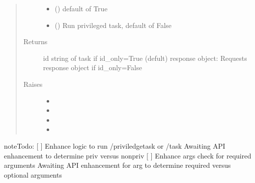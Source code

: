 \documentclass[letterpaper,10pt,english]{sphinxmanual}
\begin{document}
\begin{fulllineitems}
\begin{fulllineitems}
\begin{quote}
\begin{description}
\begin{itemize}
\item {} 
\sphinxAtStartPar
{} () \textendash{} default of True

\item {} 
\sphinxAtStartPar
{} () \textendash{} Run privileged task, default of False

\end{itemize}

\item[{Returns}] \leavevmode
\sphinxAtStartPar
id string of task if id\_only=True (defult)
response object: Requests response object if id\_only=False

\item[{Raises}] \leavevmode\begin{itemize}
\item {} 
\sphinxAtStartPar
{} \textendash{} 

\item {} 
\sphinxAtStartPar
{}\sphinxstyleliteralstrong{\sphinxupquote{ (}}\sphinxstyleliteralstrong{\sphinxupquote{)}} \textendash{} 

\item {} 
\sphinxAtStartPar
{} \textendash{} 

\item {} 
\sphinxAtStartPar
{} \textendash{} 

\end{itemize}

\end{description}\end{quote}

\begin{sphinxadmonition}{note}{\label{\detokenize{b1diagnostics-class:id1}}Todo:}
\sphinxAtStartPar
{[} {]} Enhance logic to run /priviledgetask or /task
Awaiting API enhancement to determine priv versus non\sphinxhyphen{}priv
{[} {]} Enhance args check for required arguments
Awaiting API enhancement for arg to determine required versus
optional arguments
\end{sphinxadmonition}


\end{fulllineitems}
\end{fulllineitems}
\end{document}
